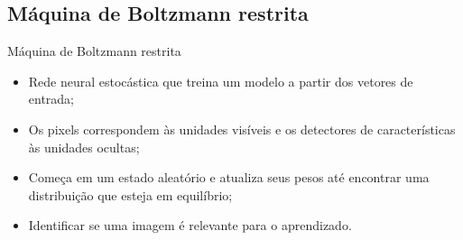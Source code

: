\documentclass{beamer}
\begin{document}
\begin{frame}{Deep Learning}
 \begin{figure}[hbpt]
 \begin{center}
   \texttt{[image: \{figuras/convnet.png]}}
 \end{center}
  \caption{}
\end{figure}





\end{frame}
\subsection{Máquina de Boltzmann restrita}
\begin{frame}{Máquina de Boltzmann restrita}
\begin{itemize}
  \item Rede neural estocástica que treina um modelo a partir dos vetores de entrada;
  \item Os pixels correspondem às unidades visíveis e os detectores de características às unidades ocultas;
  \item Começa em um estado aleatório e atualiza seus pesos até encontrar uma distribuição que esteja em equilíbrio;
  \item Identificar se uma imagem é relevante para o aprendizado.
\end{itemize}

\end{frame}
\end{document}
